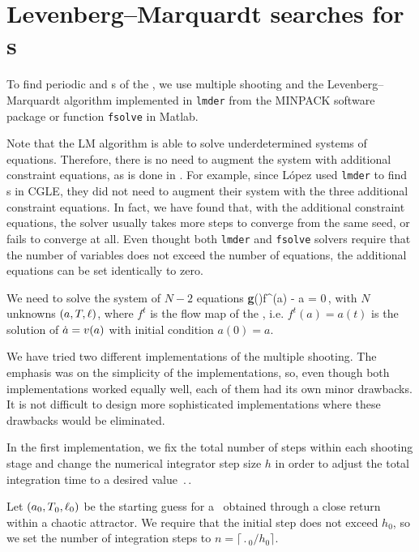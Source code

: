 
\section{Levenberg--Marquardt searches for \rpo s}
\label{sec:lmderRLD}
%
To find periodic and \rpo s of the \KSe , we use multiple shooting and
the Levenberg--Marquardt algorithm implemented in {\tt lmder} from
the MINPACK software package or function {\tt fsolve} in Matlab.

Note that the LM algorithm is able to solve underdetermined systems of
equations.  Therefore, there is no need to augment the system with
additional constraint equations, as is done in .
For example, since L{\'o}pez {\etal} used {\tt lmder} to
find \rpo s in CGLE, they did not need to augment their system with the
three additional constraint equations.  In fact, we have found that,
with the additional constraint equations, the solver usually takes more
steps to converge from the same seed, or fails to converge at all. Even
thought both {\tt lmder} and {\tt fsolve} solvers require that the
number of variables does not exceed the number of equations, the
additional equations can be set identically to zero.

We need to solve the system of $N-2$ equations
\beq
  {\bf g}(\shift)f^\period{}(a) - a = 0\,,
with $N$ unknowns $(a, {T_{}}, \ell)$, where $f^t$
is the flow map of the \KSe , i.e. $f^t(a) = a(t)$ is the solution of
$\dot{a} = v(a)$ with initial condition $a(0) = a$.

We have tried two different implementations of the multiple shooting.
The emphasis was on the simplicity of the implementations, so, even
though both implementations worked equally well, each of them had
its own minor drawbacks.  It is not difficult to design more
sophisticated implementations where these drawbacks would be
eliminated.

In the first implementation, we fix the total number of steps within
each shooting stage and change the numerical integrator step size
$h$ in order to adjust the total integration time to a desired value
$\period{}$.

Let $(a_0, {T_{}}_0, \ell_0)$ be the starting guess for a \rpo\
obtained through a close return within a chaotic attractor.  We
require that the initial step does not exceed $h_0$, so we set the
number of integration steps to $n = \lceil \period{}_0/h_0\rceil$.

